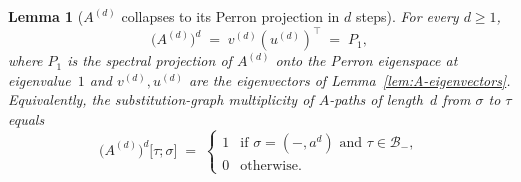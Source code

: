 \documentclass{amsart}
\newtheorem{lemma}[theorem]{Lemma}
\theoremstyle{definition}
\theoremstyle{remark}
\begin{document}
\begin{lemma}[$A^{(d)}$ collapses to its Perron projection in $d$ steps]
\label{lem:A-d-Perron}
For every $d \ge 1$,
\begin{equation}\label{eq:Ad-equals-P1}
  \bigl(A^{(d)}\bigr)^{d} \;=\; v^{(d)} (u^{(d)})^{\top}
  \;=\; P_1,
\end{equation}
where $P_1$ is the spectral projection of $A^{(d)}$ onto the
Perron eigenspace at eigenvalue~$1$ and $v^{(d)}, u^{(d)}$ are
the eigenvectors of Lemma~\ref{lem:A-eigenvectors}.  Equivalently,
the substitution-graph multiplicity of $A$-paths of length~$d$
from $\sigma$ to $\tau$ equals
\[
  \bigl(A^{(d)}\bigr)^{d}\!\bigl[\tau;\sigma\bigr]
  \;=\;
  \begin{cases}
    1 & \text{if } \sigma = (-, a^d) \text{ and } \tau \in \mathcal{B}_-, \\
    0 & \text{otherwise.}
  \end{cases}
\]
\end{lemma}
\end{document}
